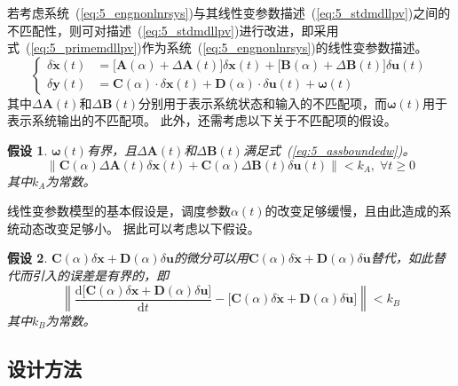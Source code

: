 \documentclass{article}
\newtheorem{assumption}{假设}
\begin{document}
若考虑系统~(\ref{eq:5_engnonlnrsys})与其线性变参数描述~(\ref{eq:5_stdmdllpv})之间的不匹配性，则可对描述~(\ref{eq:5_stdmdllpv})进行改进，即采用式~(\ref{eq:5_primemdllpv})作为系统~(\ref{eq:5_engnonlnrsys})的线性变参数描述。
\begin{equation}
\left \{
\begin{aligned}
  \delta \dot{\bm{x}}(t)&=\Big [\mathbf{A}(\alpha)+\Delta \mathbf{A}(t) \Big ] \delta \bm{x}(t)+\Big [\mathbf{B}(\alpha)+\Delta \mathbf{B}(t)\Big ] \delta \bm{u}(t)\\
  \delta \bm{y}(t)&=\mathbf{C}(\alpha)\cdot\delta \bm{x}(t)+\mathbf{D}(\alpha)\cdot \delta \bm{u}(t)+\bm{\omega}(t)
\end{aligned}
\right .
\label{eq:5_primemdllpv}
\end{equation}
其中$\Delta \mathbf{A}(t)$和$\Delta \mathbf{B}(t)$分别用于表示系统状态和输入的不匹配项，而$\bm{\omega}(t)$用于表示系统输出的不匹配项。
此外，还需考虑以下关于不匹配项的假设。
\begin{assumption}
\label{thm:5_assumption_boundedw}
$\bm{\omega}(t)$有界，且$\Delta \mathbf{A}(t)$和$\Delta \mathbf{B}(t)$满足式~(\ref{eq:5_assboundedw})。
\begin{equation}
\Big \| \mathbf{C}(\alpha)\Delta \mathbf{A}(t) \delta \bm{x}(t)+\mathbf{C}(\alpha)\Delta \mathbf{B}(t) \delta \bm{u}(t)\Big \|  < k_A,\;\forall t\geq 0
\label{eq:5_assboundedw}
\end{equation}
其中$k_A$为常数。
\end{assumption}

线性变参数模型的基本假设是，调度参数$\alpha(t)$的改变足够缓慢，且由此造成的系统动态改变足够小\cite{Shamma1988Analysis}。
据此可以考虑以下假设。
\begin{assumption}
\label{thm:5_assumption_varyslow}
$\mathbf{C}(\alpha)\delta \bm{x} + \mathbf{D}(\alpha)\delta \bm{u}$的微分可以用$\mathbf{C}(\alpha)\delta \bm{ \dot x} + \mathbf{D}(\alpha)\delta \bm{ \dot u}$替代，如此替代而引入的误差是有界的，即
\begin{equation}
    \left \| \frac{\mathrm{d} \Big [\mathbf{C}(\alpha)\delta \bm{x}+\mathbf{D}(\alpha)\delta \bm{u}\Big ]}{\mathrm{d} t} - \Big [\mathbf{C}(\alpha)\delta \bm{\dot x}+\mathbf{D}(\alpha)\delta \bm{\dot u}\Big ] \right \| <k_B
\label{eq:5_assvaryslow}
\end{equation}
其中$k_B$为常数。
\end{assumption}

\subsection{设计方法}
\label{sec:5_lpvctrldesign}
\end{document}

